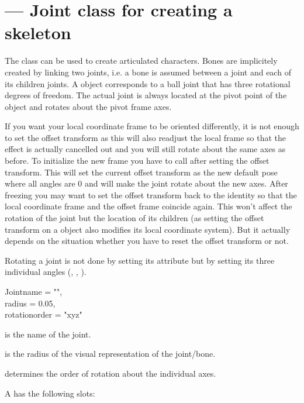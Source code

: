 
\section{ ---
         Joint class for creating a skeleton}

The  class can be used to create articulated
characters. Bones are implicitely created by linking two joints, i.e.
a bone is assumed between a joint and each of its children joints.
A  object corresponds to a ball joint that has three rotational
degrees of freedom. The actual joint is always located at the pivot point
of the  object and rotates about the pivot frame axes.

If you want your local coordinate frame to be oriented differently, it
is not enough to set the offset transform as this will also readjust the
local frame so that the effect is actually cancelled out and you will
still rotate about the same axes as before. To initialize the new frame
you have to call  after setting the offset transform.
This will set the current offset transform as the new default pose where
all angles are 0 and will make the joint rotate about the new axes.
After freezing you may want to set the offset transform back to the identity
so that the local coordinate frame and the offset frame coincide again.
This won't affect the rotation of the joint but the location of its
children (as setting the offset transform on a  object also
modifies its local coordinate system). But it actually depends on the
situation whether you have to reset the offset transform or not.

Rotating a joint is not done by setting its  attribute but
by setting its three individual angles (, , 
).

\begin{classdesc}{Joint}{name = "", \\
			 radius = 0.05, \\
	                 rotationorder = "xyz"
		         }

 is the name of the joint.

 is the radius of the visual representation of the joint/bone.

 determines the order of rotation about the individual
axes.
\end{classdesc}

A  has the following slots:

